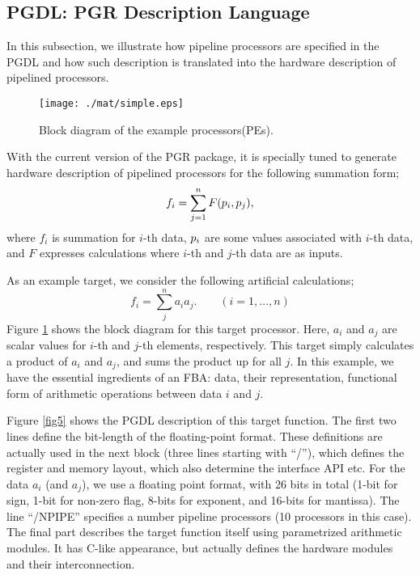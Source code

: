 \documentclass{llncs}
\begin{document}
\subsection{PGDL: PGR Description Language}
In this subsection, we illustrate how pipeline processors are
specified in the PGDL and how such description is translated
into the hardware description of pipelined processors.

\begin{figure}[htb]
\begin{center}
\texttt{[image: ./mat/simple.eps]}
\caption{Block diagram of the example processors(PEs).}
\label{fig4}
\end{center}
\end{figure}

With the current version of the PGR package, it is specially tuned
to generate hardware description of pipelined processors
for the following summation form;
\begin{equation}
f_i = \sum_{j = 1}^{n} F(\boldmath{p}_i, \boldmath{p}_j),
\end{equation}
where $f_i$ is summation for $i$-th data, $\boldmath{p}_i$ are
some values associated with $i$-th data, and
$F$ expresses calculations where $i$-th and $j$-th data are as inputs.

As an example target, we consider the following artificial calculations;
\begin{equation}
f_i = \sum_j^n {a_i a_j}.\qquad (i=1,...,n)
\end{equation}
Figure \ref{fig4} shows the block diagram
for this target processor.
Here, $a_i$ and $a_j$ are scalar values for $i$-th and
$j$-th elements, respectively.
This target simply calculates a product of $a_i$ and $a_j$, 
and sums the product up for all $j$.
In this example, we have the essential ingredients of an FBA:
data, their representation, functional form of arithmetic operations
between data $i$ and $j$.

Figure \ref{fig5} shows the PGDL description of this target function.
The first two lines define the bit-length of the floating-point format.
These definitions are actually used in the next block
(three lines starting with ``/''),
which defines the register and memory layout,
which also determine the interface API etc. 
For the data $a_i$ (and $a_j$), we use a floating point format,
with 26 bits in total (1-bit for sign, 1-bit for non-zero flag, 8-bits
for exponent, and 16-bits for mantissa).
The line ``/NPIPE'' specifies a number pipeline processors (10 processors in this case).
The final part describes the target function itself using
parametrized arithmetic modules. It has C-like appearance, but
actually defines the hardware modules and their interconnection.
\end{document}
